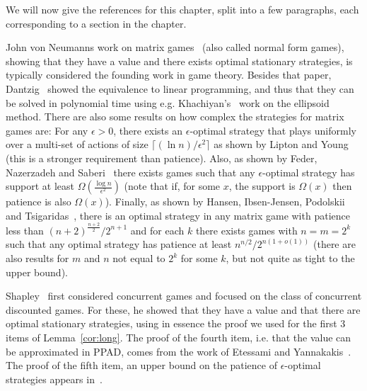We will now give the references for this chapter, split into a few paragraphs, each corresponding to a section in the chapter.

John von Neumanns work on matrix games~\cite{vonNeumann&Morgenstern:1944} (also called normal form games), showing that they have a value and there exists optimal stationary strategies, is typically considered the founding work in game theory. Besides that paper, Dantzig~\cite{Dantzig:1965} showed the equivalence to linear programming, and thus that they can be solved in polynomial time using e.g. Khachiyan's~\cite{Kha:1979} work on the ellipsoid method.
There are also some results on how complex the strategies for matrix games are: For any $\epsilon>0$, there exists an $\epsilon$-optimal strategy that plays uniformly over a multi-set of actions of size $\lceil (\ln n)/\epsilon^2\rceil$ as shown by Lipton and Young~\cite{Lipton&Young:1994} (this is a stronger requirement than patience).
Also, as shown by Feder, Nazerzadeh and Saberi~\cite{FNS:2007} there exists games such that any $\epsilon$-optimal strategy has support at least $\Omega(\frac{\log n}{\epsilon^2})$ (note that if, for some $x$, the support is $\Omega(x)$ then patience is also $\Omega(x)$).
Finally,  as shown by Hansen, Ibsen-Jensen, Podolskii and Tsigaridas~\cite{HIPT:2013}, there is an optimal strategy in any matrix game with patience less than $(n+2)^{\frac{n+2}{2}}/2^{n+1}$ and for each $k$ there exists games with $n=m=2^k$ such that any optimal strategy has patience at least $n^{n/2}/2^{n(1+o(1))}$ (there are also results for $m$ and $n$ not equal to $2^k$ for some $k$, but not quite as tight to the upper bound).

Shapley~\cite{Sha:1953} first considered concurrent games and focused on the class of concurrent discounted games. For these, he showed that they have a value and that there are optimal stationary strategies, using in essence the proof we used for the first 3 items of Lemma~\cref{cor:long}.
The proof of the fourth item, i.e. that the value can be approximated in PPAD, comes from the work of Etessami  and Yannakakis~\cite{EY:2007}. The proof of the fifth item, an upper bound on the patience of $\epsilon$-optimal strategies appears in~\cite{ibsenjensen:2012}.

